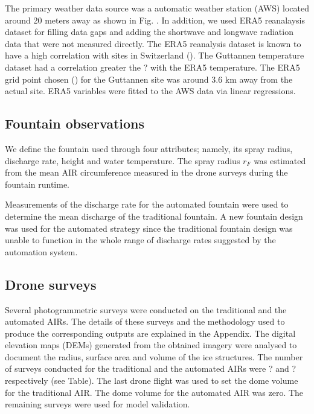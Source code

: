 \documentclass[tc, manuscript]{copernicus}
\begin{document}
The primary weather data source was a automatic weather station (AWS) located around 20 meters away as shown in
Fig. . In addition, we used ERA5 reanalaysis dataset for filling data gaps and adding the shortwave and longwave
radiation data that were not measured directly. The ERA5 reanalysis dataset is known to have a high correlation
with sites in Switzerland (). The Guttannen temperature dataset had a correlation greater the ? with the ERA5
temperature. The ERA5 grid point chosen () for the Guttannen site was around 3.6 km away from the actual site.
ERA5 variables were fitted to the AWS data via linear regressions. 

\subsection{Fountain observations}
We define the fountain used through four attributes; namely, its spray radius, discharge rate, height and water
temperature. The spray radius $r_F$ was estimated from the mean AIR circumference
measured in the drone surveys during the fountain runtime. 

Measurements of the discharge rate for the automated fountain were used to determine the mean discharge of the
traditional fountain. A new fountain design was used for the automated strategy since the traditional fountain
design was unable to function in the whole range of discharge rates suggested by the automation system.



\subsection{Drone surveys}
Several photogrammetric surveys were conducted on the traditional and the automated AIRs. The details of these
surveys and the methodology used to produce the corresponding outputs are explained in the Appendix. The digital
elevation maps (DEMs) generated from the obtained imagery were analysed to document the radius, surface area and
volume of the ice structures. The number of surveys conducted for the traditional and the automated AIRs were
? and ? respectively (see Table). The last drone flight was used to set the dome volume for the traditional AIR.
The dome volume for the automated AIR was zero.  The remaining surveys were used for model validation.
\end{document}
